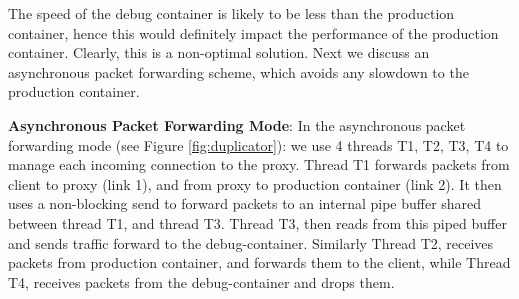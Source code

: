 The speed of the debug container is likely to be less than the production container, hence this would definitely impact the performance of the production container.
Clearly, this is a non-optimal solution. 
Next we discuss an asynchronous packet forwarding scheme, which avoids any slowdown to the production container.


\textbf{Asynchronous Packet Forwarding Mode}: 
In the asynchronous packet forwarding mode (see Figure \ref{fig:duplicator}): we use 4 threads T1, T2, T3, T4 to manage each incoming connection to the proxy.
Thread T1 forwards packets from client to proxy (link 1), and from proxy to production container (link 2). 
It then uses a non-blocking send to forward packets to an internal pipe buffer shared between thread T1, and thread T3. 
Thread T3, then reads from this piped buffer and sends traffic forward to the debug-container. 
Similarly Thread T2, receives packets from production container, and forwards them to the client, while Thread T4, receives packets from the debug-container and drops them.

